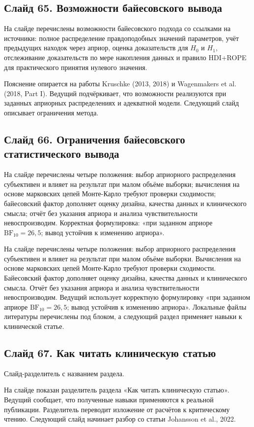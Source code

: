\documentclass[11pt,a4paper]{article}
\begin{document}
\subsection*{Слайд 65. Возможности байесовского вывода}
\begin{onslide}
На слайде перечислены возможности байесовского подхода со ссылками на источники: полное распределение правдоподобных значений параметров, учёт предыдущих находок через априор, оценка доказательств для $H_0$ и $H_1$, отслеживание доказательств по мере накопления данных и правило HDI+ROPE для практического принятия нулевого значения.
\end{onslide}
Пояснение опирается на работы Kruschke (2013, 2018) и Wagenmakers et al. (2018, Part I). Ведущий подчёркивает, что возможности реализуются при заданных априорных распределениях и адекватной модели. Следующий слайд описывает ограничения метода.
\subsection*{Слайд 66. Ограничения байесовского статистического вывода}
\begin{onslide}
На слайде перечислены четыре положения: выбор априорного распределения субъективен и влияет на результат при малом объёме выборки; вычисления на основе марковских цепей Монте-Карло требуют проверки сходимости; байесовский фактор дополняет оценку дизайна, качества данных и клинического смысла; отчёт без указания априора и анализа чувствительности невоспроизводим. Корректная формулировка: «при заданном априоре $\mathrm{BF}_{10} = 26{,}5$; вывод устойчив к изменению априора».
\end{onslide}
На слайде перечислены четыре положения: выбор априорного распределения субъективен и влияет на результат при малом объёме выборки. Вычисления на основе марковских цепей Монте-Карло требуют проверки сходимости. Байесовский фактор дополняет оценку дизайна, качества данных и клинического смысла. Отчёт без указания априора и анализа чувствительности невоспроизводим. Ведущий использует корректную формулировку «при заданном априоре $\mathrm{BF}_{10} = 26{,}5$; вывод устойчив к изменению априора». Локальные файлы литературы перечислены под блоком, а следующий раздел применяет навыки к клинической статье.

\subsection*{Слайд 67. Как читать клиническую статью}
\begin{onslide}
Слайд-разделитель с названием раздела.
\end{onslide}
На слайде показан разделитель раздела «Как читать клиническую статью». Ведущий сообщает, что полученные навыки применяются к реальной публикации. Разделитель переводит изложение от расчётов к критическому чтению. Следующий слайд начинает разбор со статьи Johansson et al., 2022.
\end{document}
